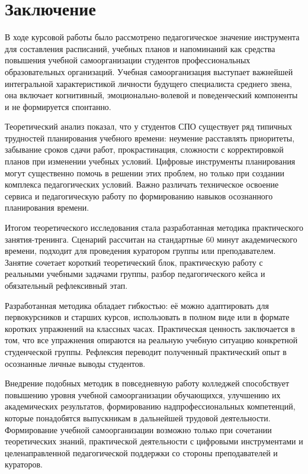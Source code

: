 \documentclass[
]{article}
\begin{document}
\section{\texorpdfstring{\textbf{Заключение}}{Заключение}}\label{ux437ux430ux43aux43bux44eux447ux435ux43dux438ux435}

В ходе курсовой работы было рассмотрено педагогическое значение
инструмента для составления расписаний, учебных планов и напоминаний как
средства повышения учебной самоорганизации студентов профессиональных
образовательных организаций. Учебная самоорганизация выступает важнейшей
интегральной характеристикой личности будущего специалиста среднего
звена, она включает когнитивный, эмоционально-волевой и поведенческий
компоненты и не формируется спонтанно.

Теоретический анализ показал, что у студентов СПО существует ряд
типичных трудностей планирования учебного времени: неумение расставлять
приоритеты, забывание сроков сдачи работ, прокрастинация, сложности с
корректировкой планов при изменении учебных условий. Цифровые
инструменты планирования могут существенно помочь в решении этих
проблем, но только при создании комплекса педагогических условий. Важно
различать техническое освоение сервиса и педагогическую работу по
формированию навыков осознанного планирования времени.

Итогом теоретического исследования стала разработанная методика
практического занятия-тренинга. Сценарий рассчитан на стандартные 60
минут академического времени, подходит для проведения куратором группы
или преподавателем. Занятие сочетает короткий теоретический блок,
практическую работу с реальными учебными задачами группы, разбор
педагогического кейса и обязательный рефлексивный этап.

Разработанная методика обладает гибкостью: её можно адаптировать для
первокурсников и старших курсов, использовать в полном виде или в
формате коротких упражнений на классных часах. Практическая ценность
заключается в том, что все упражнения опираются на реальную учебную
ситуацию конкретной студенческой группы. Рефлексия переводит полученный
практический опыт в осознанные личные выводы студентов.

Внедрение подобных методик в повседневную работу колледжей способствует
повышению уровня учебной самоорганизации обучающихся, улучшению их
академических результатов, формированию надпрофессиональных компетенций,
которые понадобятся выпускникам в дальнейшей трудовой деятельности.
Формирование учебной самоорганизации возможно только при сочетании
теоретических знаний, практической деятельности с цифровыми
инструментами и целенаправленной педагогической поддержки со стороны
преподавателей и кураторов.
\end{document}
